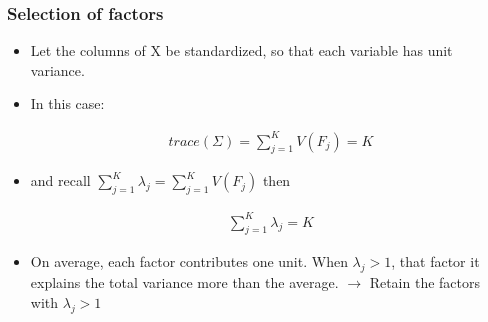 \documentclass[
  shownotes,
  xcolor={svgnames},
  hyperref={colorlinks,citecolor=DarkBlue,linkcolor=DarkRed,urlcolor=DarkBlue}
  , aspectratio=169]{beamer}
\begin{document}
\begin{frame}
\frametitle{Selection of factors}

\begin{itemize}
\item Let the columns of X be standardized, so that each variable has unit variance. 
\item In this case:

\begin{align}
trace(\Sigma) =  \sum_{j=1}^K V(F_j) = K
\end{align}

\item and recall $\sum_{j=1}^K \lambda_j= \sum_{j=1}^K V(F_j)$ then

\begin{align}
 \sum_{j=1}^K \lambda_j = K
\end{align}

\item On average, each factor contributes one unit. When $\lambda_j>1$, that factor it explains the total variance more than the average. $\rightarrow$ Retain the factors with $\lambda_j > 1$ 

\end{itemize}


\end{frame}




\end{document}
